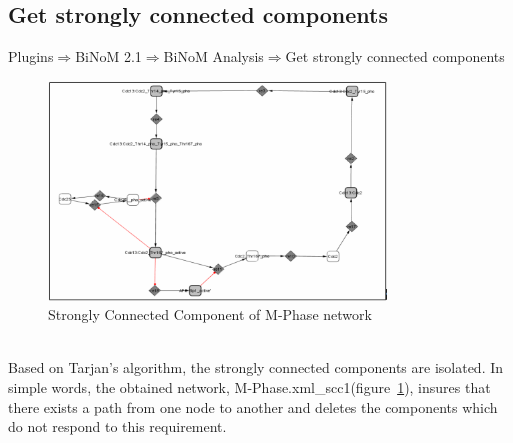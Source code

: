 \subsection{Get strongly connected components}
Plugins$\Rightarrow$BiNoM 2.1$\Rightarrow$BiNoM Analysis$\Rightarrow$Get strongly connected components\\
\begin{figure}
\centering
\includegraphics[width=0.8\textwidth]{graphics/Strongly_Connected_Component_of_M-Phase_network.png}
\caption{Strongly Connected Component of M-Phase network}
\label{Strongly_Connected_Component_of M-Phase_network}
\end{figure}
\\Based on Tarjan’s algorithm\cite{tarjan1972depth}, the strongly connected components are isolated. In simple words, the obtained network, M-Phase.xml\_scc1(figure~\ref{Strongly_Connected_Component_of M-Phase_network}), insures that there exists a path from one node to another and deletes the components which do not respond to this requirement.

